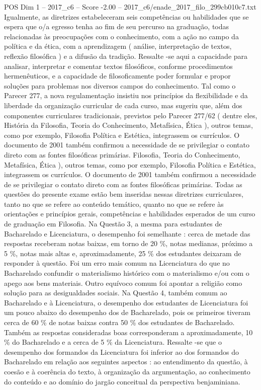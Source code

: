 \begin{textsample}{POS Dim 1 – 2017\_c6 – Score -2.00 – 2017\_c6/enade\_2017\_filo\_299cb010c7.txt}
Igualmente, as diretrizes estabeleceram seis competências ou habilidades que se espera que o/a egresso tenha ao fim de seu percurso na graduação, todas relacionadas às preocupações com o conhecimento, com a ação no campo da política e da ética, com a aprendizagem ( análise, interpretação de textos, reflexão filosófica ) e a difusão da tradição.
Ressalte -se aqui a capacidade para analisar, interpretar e comentar textos filosóficos, conforme procedimentos hermenêuticos, e a capacidade de filosoficamente poder formular e propor soluções para problemas nos diversos campos do conhecimento.
Tal como o Parecer 277, a nova regulamentação insistiu nos princípios da flexibilidade e da liberdade da organização curricular de cada curso, mas sugeriu que, além dos componentes curriculares tradicionais, previstos pelo Parecer 277/62 ( dentre eles, História da Filosofia, Teoria do Conhecimento, Metafísica, Ética ), outros temas, como por exemplo, Filosofia Política e Estética, integrassem os currículos.
O documento de 2001 também confirmou a necessidade de se privilegiar o contato direto com as fontes filosóficas primárias.
Filosofia, Teoria do Conhecimento, Metafísica, Ética ), outros temas, como por exemplo, Filosofia Política e Estética, integrassem os currículos.
O documento de 2001 também confirmou a necessidade de se privilegiar o contato direto com as fontes filosóficas primárias.
Todas as questões do presente exame estão bem inseridas nessas diretrizes curriculares, tanto no que se refere ao conteúdo temático, quanto no que se refere às orientações e princípios gerais, competências e habilidades esperados de um curso de graduação em Filosofia.
Na Questão 3, a mesma para estudantes de Bacharelado e Licenciatura, o desempenho foi semelhante : cerca de metade das respostas receberam notas baixas, em torno de 20 \%, notas medianas, próximo a 5 \%, notas mais altas e, aproximadamente, 25 \% dos estudantes deixaram de responder à questão.
Foi um erro mais comum na Licenciatura do que no Bacharelado confundir o materialismo histórico com o materialismo e/ou com o apego aos bens materiais.
Outro equívoco comum foi apontar a religião como solução para as desigualdades sociais.
Na Questão 4, também comum ao Bacharelado e à Licenciatura, o desempenho dos estudantes de Licenciatura foi um pouco abaixo do desempenho dos de Bacharelado, pois os primeiros tiveram cerca de 60 \% de notas baixas contra 50 \% dos estudantes de Bacharelado.
Também as respostas consideradas boas corresponderam a aproximadamente, 10 \% do Bacharelado e a cerca de 5 \% da Licenciatura.
Ressalte -se que o desempenho dos formandos da Licenciatura foi inferior ao dos formandos do Bacharelado em relação aos seguintes aspectos : ao entendimento da questão, à coesão e à coerência do texto, à organização da argumentação, ao conhecimento do conteúdo e ao domínio do jargão conceitual da perspectiva benjaminiana.

\end{textsample}
